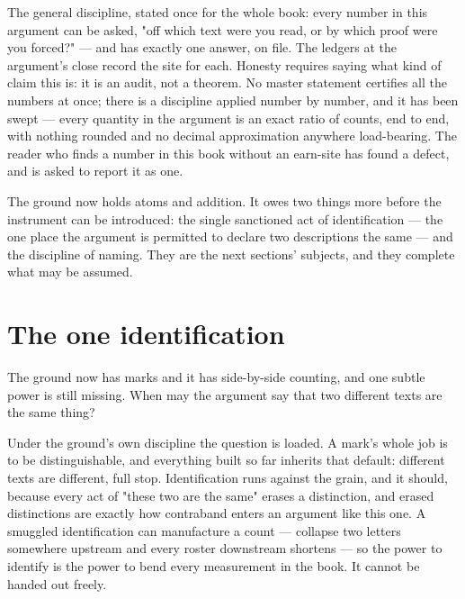 The general discipline, stated once for the whole book: every number in this argument
can be asked, "off which text were you read, or by which proof were you forced?" ---
and has exactly one answer, on file. The ledgers at the argument's close record the
site for each. Honesty requires saying what kind of claim this is: it is an audit, not
a theorem. No master statement certifies all the numbers at once; there is a discipline
applied number by number, and it has been swept --- every quantity in the argument is
an exact ratio of counts, end to end, with nothing rounded and no decimal approximation
anywhere load-bearing. The reader who finds a number in this book without an earn-site
has found a defect, and is asked to report it as one.

The ground now holds atoms and addition. It owes two things more before the instrument
can be introduced: the single sanctioned act of identification --- the one place the
argument is permitted to declare two descriptions the same --- and the discipline of
naming. They are the next sections' subjects, and they complete what may be assumed.

\section{The one identification}

The ground now has marks and it has side-by-side counting, and one subtle power is still
missing. When may the argument say that two different texts are the same thing?

Under the ground's own discipline the question is loaded. A mark's whole job is to be
distinguishable, and everything built so far inherits that default: different texts are
different, full stop. Identification runs against the grain, and it should, because
every act of "these two are the same" erases a distinction, and erased distinctions are
exactly how contraband enters an argument like this one. A smuggled identification can
manufacture a count --- collapse two letters somewhere upstream and every roster
downstream shortens --- so the power to identify is the power to bend every measurement
in the book. It cannot be handed out freely.

